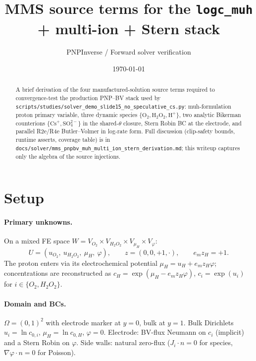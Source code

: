 \documentclass[11pt]{article}
\title{MMS source terms for the \texttt{logc\_muh} + multi-ion + Stern stack}
\author{PNPInverse / Forward solver verification}
\date{\today}
\begin{document}
\maketitle

\begin{abstract}
A brief derivation of the four manufactured-solution source terms required
to convergence-test the production PNP--BV stack used by
\verb|scripts/studies/solver_demo_slide15_no_speculative_cs.py|: muh-formulation
proton primary variable, three dynamic species $\{\mathrm{O_2}, \mathrm{H_2O_2},
\mathrm{H^+}\}$, two analytic Bikerman counterions $\{\mathrm{Cs^+},
\mathrm{SO_4^{2-}}\}$ in the shared-$\theta$ closure, Stern Robin BC at the
electrode, and parallel R2e/R4e Butler--Volmer in log-rate form. Full
discussion (clip-safety bounds, runtime asserts, coverage table) is in
\verb|docs/solver/mms_pnpbv_muh_multi_ion_stern_derivation.md|; this writeup
captures only the algebra of the source injections.
\end{abstract}

\section{Setup}

\paragraph{Primary unknowns.} On a mixed FE space $W = V_{O_2} \times V_{H_2O_2}
\times V_{\mu_H} \times V_\varphi$:
\[
  U = (u_{O_2},\ u_{H_2O_2},\ \mu_H,\ \varphi),
  \qquad
  z = (0, 0, +1, \cdot),
  \qquad
  e_m z_H = +1.
\]
The proton enters via its electrochemical potential
$\mu_H = u_H + e_m z_H \varphi$; concentrations are reconstructed as
$c_H = \exp(\mu_H - e_m z_H \varphi)$, $c_i = \exp(u_i)$ for $i \in \{O_2,
H_2O_2\}$.

\paragraph{Domain and BCs.} $\Omega = (0,1)^2$ with electrode marker at $y=0$,
bulk at $y=1$. Bulk Dirichlets $u_i = \ln c_{0,i}$, $\mu_H = \ln c_{0,H}$,
$\varphi = 0$. Electrode: BV-flux Neumann on $c_i$ (implicit) and a Stern
Robin on $\varphi$. Side walls: natural zero-flux ($J_i \cdot n = 0$ for
species, $\nabla \varphi \cdot n = 0$ for Poisson).
\end{document}
